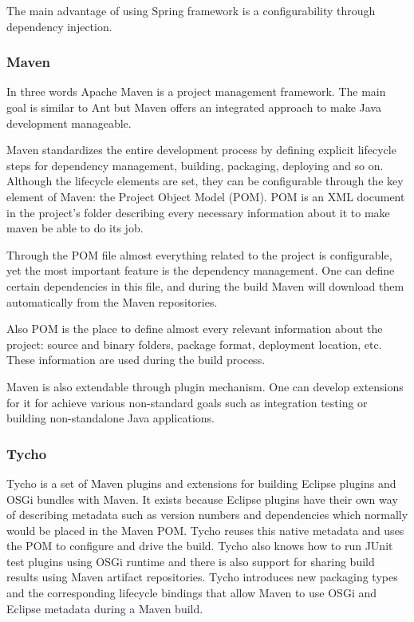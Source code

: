 %
The main advantage of using Spring framework is a configurability through
dependency injection. 


\subsubsection{Maven}
In three words Apache Maven is a project management framework. The main goal is 
similar to Ant but Maven offers an integrated approach to make Java development
manageable. 

Maven standardizes the entire development process by defining explicit lifecycle
steps for dependency management, building, packaging, deploying and so on.
Although the lifecycle elements are set, they can be configurable through the 
key element of Maven: the Project Object Model (POM). POM is an XML document in 
the project's folder describing every necessary information about it to make 
maven be able to do its job. 

Through the POM file almost everything related to the project is configurable,
yet the most important feature is the dependency management. One can define
certain dependencies in this file, and during the build Maven will download
them automatically from the Maven repositories.

Also POM is the place to define almost every relevant information about the project:
source and binary folders, package format, deployment location, etc. These information
are used during the build process.

Maven is also extendable through plugin mechanism. One can develop extensions for it
for achieve various non-standard goals such as integration testing or building 
non-standalone Java applications.

\subsubsection{Tycho}
Tycho is a set of Maven plugins and extensions for building Eclipse plugins and
OSGi bundles with Maven. It exists because Eclipse plugins have their own way of
describing metadata such as version numbers and dependencies which normally
would be placed in the Maven POM. Tycho reuses this native metadata 
and uses the POM to configure and drive the build. Tycho also knows
how to run JUnit test plugins using OSGi runtime and there is also support for
sharing build results using Maven artifact repositories. Tycho introduces
new packaging types and the corresponding lifecycle bindings that allow Maven to
use OSGi and Eclipse metadata during a Maven build.

